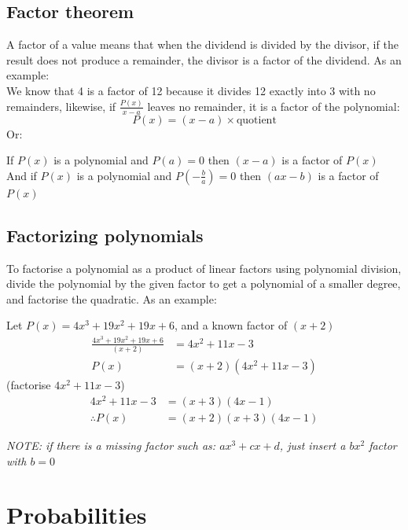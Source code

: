 \documentclass{report}
\begin{document}
\subsection{Factor theorem}
A factor of a value means that when the dividend is divided by the divisor, if the result does not produce a remainder, the divisor is a factor of the dividend.  As an example:\\
We know that 4 is a factor of 12 because it divides 12 exactly into 3 with no remainders, likewise, if $\frac{P(x)}{x - a}$ leaves no remainder, it is a factor of the polynomial:\\
$$
	P(x) = (x - a) \times \text{quotient}
$$
Or:
\begin{center}
	If $P(x)$ is a polynomial and $P(a) = 0$ then $(x - a)$ is a factor of $P(x)$\\
	And if $P(x)$ is a polynomial and $P(-\frac{b}{a}) = 0$ then $(ax - b)$ is a factor of $P(x)$
\end{center}

\subsection{Factorizing polynomials}
To factorise a polynomial as a product of linear factors using polynomial division, divide the polynomial by the given factor to get a polynomial of a smaller degree, and factorise the quadratic.  As an example:\\
\begin{center}
	Let $P(x) = 4x^3 + 19x^2 + 19x + 6$, and a known factor of $(x + 2)$
	\begin{align*}
		\frac{4x^3 + 19x^2 + 19x + 6}{(x + 2)} & = 4x^2 + 11x - 3          \\
		P(x)                                   & = (x + 2)(4x^2 + 11x - 3)
	\end{align*}
	(factorise $4x^2 + 11x - 3$)
	\begin{align*}
		4x^2 + 11x - 3  & = (x + 3)(4x - 1)        \\
		\therefore P(x) & = (x + 2)(x + 3)(4x - 1)
	\end{align*}
\end{center}

\begin{center}
	\emph{NOTE: if there is a missing factor such as: $ax^3 + cx + d$, just insert a $bx^2$ factor with $b = 0$}
\end{center}

\section{Probabilities}
\end{document}
